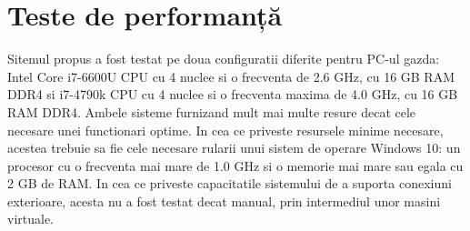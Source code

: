  \section{Teste de performanță}

Sitemul propus a fost testat pe doua configuratii diferite pentru PC-ul gazda: Intel Core i7-6600U CPU cu 4 nuclee si o frecventa de 2.6 GHz, cu 16 GB RAM DDR4 si i7-4790k CPU cu 4 nuclee si o frecventa maxima de 4.0 GHz, cu 16 GB RAM DDR4. Ambele sisteme furnizand mult mai multe resure decat cele necesare unei functionari optime. In cea ce priveste resursele minime necesare, acestea trebuie sa fie cele necesare rularii unui sistem de operare Windows 10: un procesor cu o frecventa mai mare de 1.0 GHz si o memorie mai mare sau egala cu 2 GB de RAM. In cea ce priveste capacitatile sistemului de a suporta conexiuni exterioare, acesta nu a fost testat decat manual, prin intermediul unor masini virtuale.